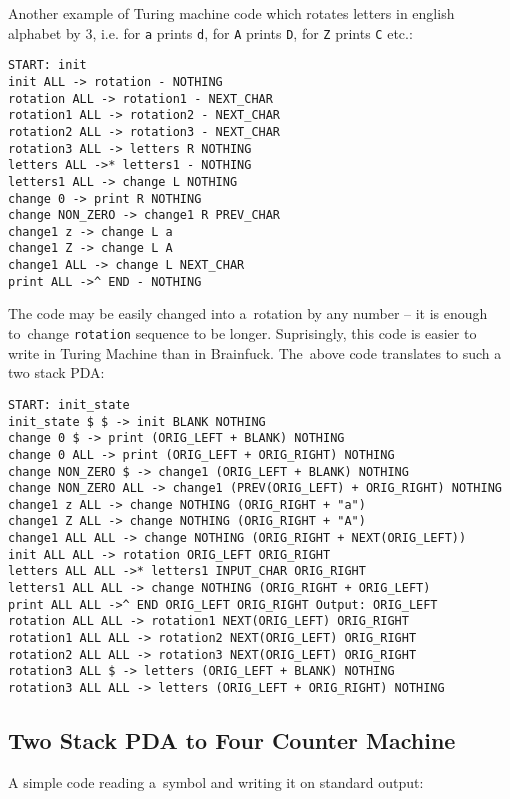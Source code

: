 \documentclass[english,shortabstract,mgr]{iithesis}
\begin{document}
Another example of Turing machine code which rotates letters in english
alphabet by $3$, i.e. for \texttt{a} prints \texttt{d}, for \texttt{A}
prints \texttt{D}, for \texttt{Z} prints \texttt{C} etc.:

\begin{verbatim}
START: init
init ALL -> rotation - NOTHING
rotation ALL -> rotation1 - NEXT_CHAR
rotation1 ALL -> rotation2 - NEXT_CHAR
rotation2 ALL -> rotation3 - NEXT_CHAR
rotation3 ALL -> letters R NOTHING
letters ALL ->* letters1 - NOTHING
letters1 ALL -> change L NOTHING
change 0 -> print R NOTHING
change NON_ZERO -> change1 R PREV_CHAR
change1 z -> change L a
change1 Z -> change L A
change1 ALL -> change L NEXT_CHAR
print ALL ->^ END - NOTHING
\end{verbatim}

The code may be easily changed into a~rotation by any number -- it is enough
to~change \texttt{rotation} sequence to be longer. Suprisingly, this code
is easier to write in Turing Machine than in Brainfuck. The~above code
translates to such a two stack PDA:

\begin{verbatim}
START: init_state
init_state $ $ -> init BLANK NOTHING
change 0 $ -> print (ORIG_LEFT + BLANK) NOTHING
change 0 ALL -> print (ORIG_LEFT + ORIG_RIGHT) NOTHING
change NON_ZERO $ -> change1 (ORIG_LEFT + BLANK) NOTHING
change NON_ZERO ALL -> change1 (PREV(ORIG_LEFT) + ORIG_RIGHT) NOTHING
change1 z ALL -> change NOTHING (ORIG_RIGHT + "a")
change1 Z ALL -> change NOTHING (ORIG_RIGHT + "A")
change1 ALL ALL -> change NOTHING (ORIG_RIGHT + NEXT(ORIG_LEFT))
init ALL ALL -> rotation ORIG_LEFT ORIG_RIGHT
letters ALL ALL ->* letters1 INPUT_CHAR ORIG_RIGHT
letters1 ALL ALL -> change NOTHING (ORIG_RIGHT + ORIG_LEFT)
print ALL ALL ->^ END ORIG_LEFT ORIG_RIGHT Output: ORIG_LEFT
rotation ALL ALL -> rotation1 NEXT(ORIG_LEFT) ORIG_RIGHT
rotation1 ALL ALL -> rotation2 NEXT(ORIG_LEFT) ORIG_RIGHT
rotation2 ALL ALL -> rotation3 NEXT(ORIG_LEFT) ORIG_RIGHT
rotation3 ALL $ -> letters (ORIG_LEFT + BLANK) NOTHING
rotation3 ALL ALL -> letters (ORIG_LEFT + ORIG_RIGHT) NOTHING
\end{verbatim}

\subsection{Two Stack PDA to Four Counter Machine}

A simple code reading a~symbol and writing it on standard output:
\end{document}
